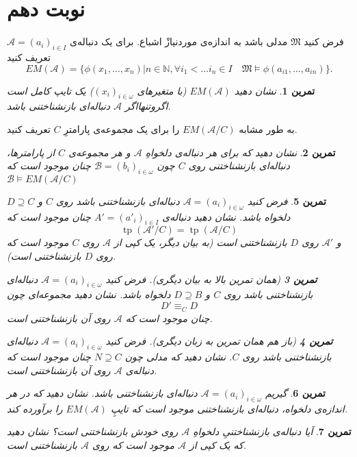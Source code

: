 \documentclass[12pt,a4paper]{report}
\theoremstyle{colorhead}
\newtheorem{tam}{تمرین}
\DeclareMathOperator{\tp}{tp}
\begin{document}
\section{نوبت دهم}
فرض کنید
$\mathfrak{M}$
مدلی باشد به اندازه‌ی موردنیازْ اشباع.
برای یک دنباله‌ی
$\mathcal{A}=(a_i)_{i\in I}$
تعریف کنید
\[
EM(\mathcal{A})=\{\phi(x_1,\ldots,x_n)|n\in \mathbb{N}, 
\forall i_1<\ldots i_n\in I\quad 
\mathfrak{M}\models \phi(a_{i1},\ldots,a_{in})\}.
\]
\begin{tam}
نشان دهید
$EM(\mathcal{A})$
(با متغیرهای 
$(x_i)_{i\in \omega}$)
یک تایپ کامل 
است
 اگروتنهااگر
$\mathcal{A}$
دنباله‌ای بازنشناختنی باشد. 
\end{tam}
به طور مشابه
$EM(\mathcal{A}/C)$
را برای یک مجموعه‌ی پارامترِ 
$C$
تعریف کنید.
\begin{tam}
نشان دهید که برای هر دنباله‌ی دلخواهِ
$\mathcal{A}$
و هر مجموعه‌ی
$C$
از پارامترها،
دنباله‌ای 
بازنشناختنی روی
$C$
چون
$\mathcal{B}=(b_i)_{i\in \omega}$
چنان موجود است که
$\mathcal{B}\models EM(\mathcal{A}/C)$
\end{tam}
\begin{tam}
فرض کنید 
$\mathcal{A}=(a_i)_{i\in \omega}$
دنباله‌ای بازنشناختنی باشد روی
$C$
و
$D\supseteq C$
دلخواه باشد. نشان دهید دنباله‌ی 
$A'=(a'_i)_{i\in I}$
چنان موجود است که 
\[
\tp(\mathcal{A}'/C)=\tp(\mathcal{A}/C) 
\]
و
$\mathcal{A}'$
روی
$D$
بازنشناختنی است (به بیان دیگر، یک کپی از
$\mathcal{A}$
روی
$C$
موجود است که روی
$D$
بازنشناختنی است). 
\begin{tam}[همان تمرین بالا به بیان دیگری]
فرض کنید 
$\mathcal{A}=(a_i)_{i\in \omega}$
دنباله‌ای بازنشناختنی باشد روی
$C$
و
$D\supseteq B$
دلخواه باشد.
نشان دهید مجموعه‌ای چون
\[
D'\equiv_C D
\]
چنان موجود است که 
$\mathcal{A}$
روی آن بازنشناختنی است.
\end{tam}
\begin{tam}[باز هم همان تمرین به زبان دیگری]
فرض کنید 
$\mathcal{A}=(a_i)_{i\in \omega}$
دنباله‌ای بازنشناختنی باشد روی
$C$.
 نشان دهید که 
مدلی چون
$N\supseteq C$
چنان موجود است که دنباله‌ی
$\mathcal{A}$
روی آن بازنشناختنی است.
\end{tam}
\end{tam}
\begin{tam}
گیریم
$\mathcal{A}=(a_i)_{i\in \omega}$
دنباله‌ای بازنشناختنی باشد. نشان دهید که در هر اندازه‌ی دلخواه، دنباله‌ای
بازنشناختنی 
 موجود است که تایپِ
$EM(\mathcal{A})$
را برآورده کند.
\end{tam}
\begin{tam}
آیا دنباله‌ی بازنشناختنیِ‌ دلخواهِ
$\mathcal{A}$
روی خودش بازنشناختنی است؟‌ نشان دهید که یک کپی از
$\mathcal{A}$
موجود است که
روی
$\mathcal{A}$
بازنشناختنی است.
\end{tam}
\end{document}
